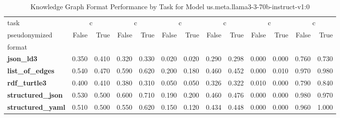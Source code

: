 \begin{table}
\caption{Knowledge Graph Format Performance by Task for Model us.meta.llama3-3-70b-instruct-v1:0}
\label{tab:results_us.meta.llama3-3-70b-instruct-v1:0}
\begin{tabular}{lrrrrrrrrrrrr}
\toprule
task & \multicolumn{2}{c}{c}{AggByRelation} & \multicolumn{2}{c}{c}{AggNeighborProperties} & \multicolumn{2}{c}{c}{HighestDegreeNode} & \multicolumn{2}{c}{c}{Overall} & \multicolumn{2}{c}{c}{ShortestPath} & \multicolumn{2}{c}{c}{TripleRetrieval} \\
pseudonymized & False & True & False & True & False & True & False & True & False & True & False & True \\
format &  &  &  &  &  &  &  &  &  &  &  &  \\
\midrule
\textbf{json_ld3} & 0.350 & 0.410 & 0.320 & 0.330 & 0.020 & 0.020 & 0.290 & 0.298 & 0.000 & 0.000 & 0.760 & 0.730 \\
\textbf{list_of_edges} & 0.540 & 0.470 & 0.590 & 0.620 & 0.200 & 0.180 & 0.460 & 0.452 & 0.000 & 0.010 & 0.970 & 0.980 \\
\textbf{rdf_turtle3} & 0.400 & 0.410 & 0.380 & 0.310 & 0.050 & 0.050 & 0.326 & 0.322 & 0.010 & 0.000 & 0.790 & 0.840 \\
\textbf{structured_json} & 0.530 & 0.500 & 0.600 & 0.710 & 0.190 & 0.200 & 0.460 & 0.476 & 0.000 & 0.000 & 0.980 & 0.970 \\
\textbf{structured_yaml} & 0.510 & 0.500 & 0.550 & 0.620 & 0.150 & 0.120 & 0.434 & 0.448 & 0.000 & 0.000 & 0.960 & 1.000 \\
\bottomrule
\end{tabular}
\end{table}
